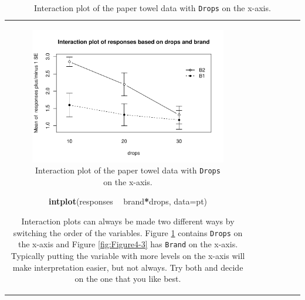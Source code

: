 \documentclass[]{book}
\newenvironment{Shaded}{\begin{snugshade}}{\end{snugshade}}
\newcommand{\KeywordTok}[1]{\textcolor[rgb]{0.13,0.29,0.53}{\textbf{#1}}}
\newcommand{\DataTypeTok}[1]{\textcolor[rgb]{0.13,0.29,0.53}{#1}}
\newcommand{\StringTok}[1]{\textcolor[rgb]{0.31,0.60,0.02}{#1}}
\newcommand{\OperatorTok}[1]{\textcolor[rgb]{0.81,0.36,0.00}{\textbf{#1}}}
\newcommand{\NormalTok}[1]{#1}
\theoremstyle{definition}
\theoremstyle{definition}
\theoremstyle{remark}
\begin{document}
\begin{longtable}[]{@{}ccccccc@{}}
\begin{minipage}[b]{0.10\columnwidth}
\begin{figure}
\centering
\includegraphics{04-twoWayAnova_files/figure-latex/Figure4-2-1.pdf}
\caption{\label{fig:Figure4-2}Interaction plot of the paper towel data with
\texttt{Drops} on the x-axis.}
\end{figure}

\begin{Shaded}
\begin{Highlighting}[]
\KeywordTok{intplot}\NormalTok{(responses }\OperatorTok{~}\StringTok{ }\NormalTok{brand}\OperatorTok{*}\NormalTok{drops, }\DataTypeTok{data=}\NormalTok{pt)}
\end{Highlighting}
\end{Shaded}

Interaction plots can always be made two different ways by switching the
order of the variables. Figure \ref{fig:Figure4-2} contains
\texttt{Drops} on the x-axis and Figure \ref{fig:Figure4-3} has
\texttt{Brand} on the x-axis. Typically putting the variable with more
levels on the x-axis will make interpretation easier, but not always.
Try both and decide on the one that you like best.





\end{minipage}
\end{longtable}
\end{document}
